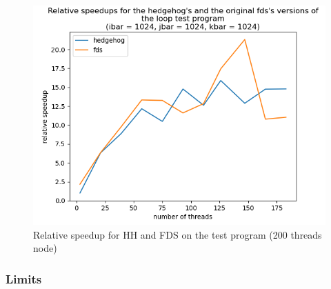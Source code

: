 \begin{figure}[h!]
  \begin{center}
    \includegraphics[scale=0.2]{../../img/fds-loops/relative_speedup.png}
    \caption{Relative speedup for HH and FDS on the test program (200 threads node)}
    \label{fig:label}
  \end{center}
\end{figure}

\subsubsection{Limits}

